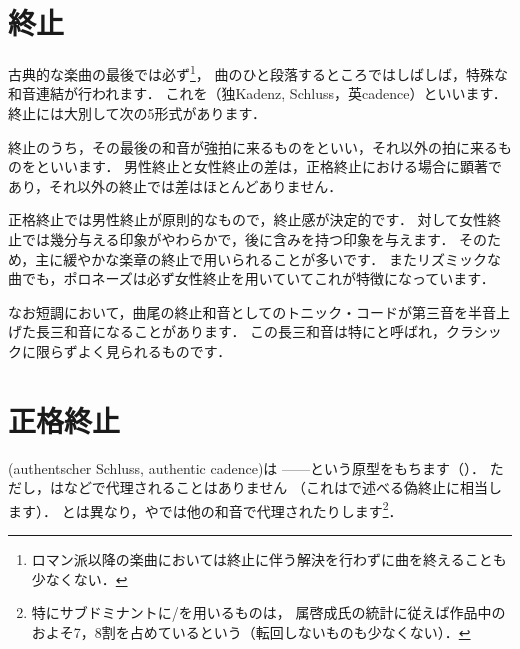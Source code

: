 \documentclass[dvipdfmx,uplatex,b5paper,openany,jbase=12Q,nomag*,textwidth-limit=44%
               ]{gachimuchi}
\begin{document}
\section{終止}
古典的な楽曲の最後では必ず\footnote{ロマン派以降の楽曲においては終止に伴う解決を行わずに曲を終えることも少なくない．}，
曲のひと段落するところではしばしば，特殊な和音連結が行われます．
これを（独Kadenz, Schluss，英cadence）といいます．
終止には大別して次の5形式があります．

終止のうち，その最後の和音が強拍に来るものをといい，それ以外の拍に来るものをといいます．
男性終止と女性終止の差は，正格終止における場合に顕著であり，それ以外の終止では差はほとんどありません．

正格終止では男性終止が原則的なもので，終止感が決定的です．
対して女性終止では幾分与える印象がやわらかで，後に含みを持つ印象を与えます．
そのため，主に緩やかな楽章の終止で用いられることが多いです．
またリズミックな曲でも，ポロネーズは必ず女性終止を用いていてこれが特徴になっています．

なお短調において，曲尾の終止和音としてのトニック・コードが第三音を半音上げた長三和音になることがあります．
この長三和音は特にと呼ばれ，クラシックに限らずよく見られるものです．

\section{正格終止}
\xkanjispace(authentscher Schluss, authentic cadence)は
------という原型をもちます（）．
ただし，は\Gnvi\Min などで代理されることはありません
（これはで述べる偽終止に相当します）．
とは異なり，やでは他の和音で代理されたりします\footnote{%
  特にサブドミナントに\Gnii\Min{}/\Gniv を用いるものは，
  属啓成氏の統計に従えば作品中のおよそ7，8割を占めているという（転回しないものも少なくない）\cite{ccSAKKA1}．
}．
\end{document}
